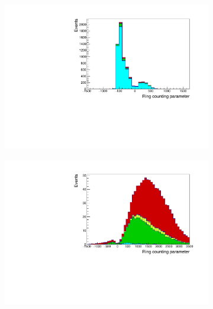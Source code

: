 \begin{figure}[h]
  \begin{subfigure}[t]{0.49\textwidth}
    \includegraphics[width=\textwidth, trim={0mm 0mm 0mm 0mm}, clip,page=1]{Figures/Selections/RCParam_SGE0Dcy.pdf}
  \end{subfigure}%
  \begin{subfigure}[t]{0.49\textwidth}
    \includegraphics[width=\textwidth, trim={0mm 0mm 0mm 0mm}, clip,page=1]{Figures/Selections/RCParam_MRENue.pdf}
  \end{subfigure}
  \begin{subfigure}[t]{0.49\textwidth}

\end{subfigure}
\end{figure}
